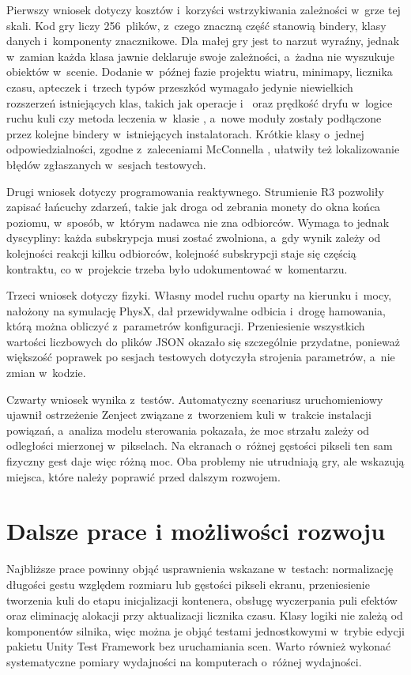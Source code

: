 Pierwszy wniosek dotyczy kosztów i~korzyści wstrzykiwania zależności w~grze tej skali.
Kod gry liczy 256~plików, z~czego znaczną część stanowią bindery, klasy danych i~komponenty
znacznikowe. Dla małej gry jest to narzut wyraźny, jednak w~zamian każda klasa jawnie
deklaruje swoje zależności, a~żadna nie wyszukuje obiektów w~scenie. Dodanie w~późnej fazie
projektu wiatru, minimapy, licznika czasu, apteczek i~trzech typów przeszkód wymagało
jedynie niewielkich rozszerzeń istniejących klas, takich jak operacje 
i~ oraz prędkość dryfu w~logice ruchu kuli czy metoda leczenia w~klasie
, a~nowe moduły zostały podłączone przez kolejne bindery
w~istniejących instalatorach. Krótkie klasy o~jednej
odpowiedzialności, zgodne z~zaleceniami McConnella \cite{mcconnell}, ułatwiły też
lokalizowanie błędów zgłaszanych w~sesjach testowych.

Drugi wniosek dotyczy programowania reaktywnego. Strumienie R3 pozwoliły zapisać łańcuchy
zdarzeń, takie jak droga od zebrania monety do okna końca poziomu, w~sposób, w~którym
nadawca nie zna odbiorców. Wymaga to jednak dyscypliny: każda subskrypcja musi zostać
zwolniona, a~gdy wynik zależy od kolejności reakcji kilku odbiorców, kolejność subskrypcji
staje się częścią kontraktu, co w~projekcie trzeba było udokumentować w~komentarzu.

Trzeci wniosek dotyczy fizyki. Własny model ruchu oparty na kierunku i~mocy, nałożony na
symulację PhysX, dał przewidywalne odbicia i~drogę hamowania, którą można obliczyć
z~parametrów konfiguracji. Przeniesienie wszystkich wartości liczbowych do plików JSON
okazało się szczególnie przydatne, ponieważ większość poprawek po sesjach testowych
dotyczyła strojenia parametrów, a~nie zmian w~kodzie.

Czwarty wniosek wynika z~testów. Automatyczny scenariusz uruchomieniowy ujawnił
ostrzeżenie Zenject związane z~tworzeniem kuli w~trakcie instalacji powiązań, a~analiza
modelu sterowania pokazała, że moc strzału zależy od odległości mierzonej w~pikselach.
Na ekranach o~różnej gęstości pikseli ten sam fizyczny gest daje więc różną moc. Oba
problemy nie utrudniają gry, ale wskazują miejsca, które należy poprawić przed dalszym
rozwojem.

\section{Dalsze prace i możliwości rozwoju}

Najbliższe prace powinny objąć usprawnienia wskazane w~testach: normalizację długości
gestu względem rozmiaru lub gęstości pikseli ekranu, przeniesienie tworzenia kuli do etapu
inicjalizacji kontenera, obsługę wyczerpania puli efektów oraz eliminację alokacji przy
aktualizacji licznika czasu. Klasy logiki nie zależą od komponentów silnika, więc można je
objąć testami jednostkowymi w~trybie edycji pakietu Unity Test Framework bez uruchamiania
scen. Warto również wykonać systematyczne pomiary wydajności na komputerach o~różnej wydajności.

